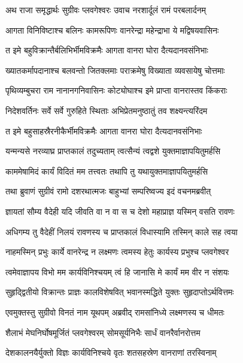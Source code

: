 
\twolineshloka
{अथ राजा समृद्धार्थः सुग्रीवः प्लवगेश्वरः}
{उवाच नरशार्दूलं रामं परबलार्दनम्} %

\twolineshloka
{आगता विनिविष्टाश्च बलिनः कामरूपिणः}
{वानरेन्द्रा महेन्द्राभा ये मद्विषयवासिनः} %

\twolineshloka
{त इमे बहुविक्रान्तैर्बलिभिर्भीमविक्रमैः}
{आगता वानरा घोरा दैत्यदानवसंनिभाः} %

\twolineshloka
{ख्यातकर्मापदानाश्च बलवन्तो जितक्लमाः}
{पराक्रमेषु विख्याता व्यवसायेषु चोत्तमाः} %

\twolineshloka
{पृथिव्यम्बुचरा राम नानानगनिवासिनः}
{कोट्योघाश्च इमे प्राप्ता वानरास्तव किंकराः} %

\twolineshloka
{निदेशवर्तिनः सर्वे सर्वे गुरुहिते स्थिताः}
{अभिप्रेतमनुष्ठातुं तव शक्ष्यन्त्यरिंदम} %

\twolineshloka
{त इमे बहुसाहस्रैरनीकैर्भीमविक्रमैः}
{आगता वानरा घोरा दैत्यदानवसंनिभाः} %

\twolineshloka
{यन्मन्यसे नरव्याघ्र प्राप्तकालं तदुच्यताम्}
{त्वत्सैन्यं त्वद्वशे युक्तमाज्ञापयितुमर्हसि} %

\twolineshloka
{काममेषामिदं कार्यं विदितं मम तत्त्वतः}
{तथापि तु यथायुक्तमाज्ञापयितुमर्हसि} %

\twolineshloka
{तथा ब्रुवाणं सुग्रीवं रामो दशरथात्मजः}
{बाहुभ्यां सम्परिष्वज्य इदं वचनमब्रवीत्} %

\twolineshloka
{ज्ञायतां सौम्य वैदेही यदि जीवति वा न वा}
{स च देशो महाप्राज्ञ यस्मिन् वसति रावणः} %

\twolineshloka
{अधिगम्य तु वैदेहीं निलयं रावणस्य च}
{प्राप्तकालं विधास्यामि तस्मिन् काले सह त्वया} %

\twolineshloka
{नाहमस्मिन् प्रभुः कार्ये वानरेन्द्र न लक्ष्मणः}
{त्वमस्य हेतुः कार्यस्य प्रभुश्च प्लवगेश्वर} %

\twolineshloka
{त्वमेवाज्ञापय विभो मम कार्यविनिश्चयम्}
{त्वं हि जानासि मे कार्यं मम वीर न संशयः} %

\twolineshloka
{सुहृद्द्वितीयो विक्रान्तः प्राज्ञः कालविशेषवित्}
{भवानस्मद्धिते युक्तः सुहृदाप्तोऽर्थवित्तमः} %

\twolineshloka
{एवमुक्तस्तु सुग्रीवो विनतं नाम यूथपम्}
{अब्रवीद् रामसांनिध्ये लक्ष्मणस्य च धीमतः} %

\twolineshloka
{शैलाभं मेघनिर्घोषमूर्जितं प्लवगेश्वरम्}
{सोमसूर्यनिभैः सार्धं वानरैर्वानरोत्तम} %

\twolineshloka
{देशकालनयैर्युक्तो विज्ञः कार्यविनिश्चये}
{वृतः शतसहस्रेण वानराणां तरस्विनाम्} %

